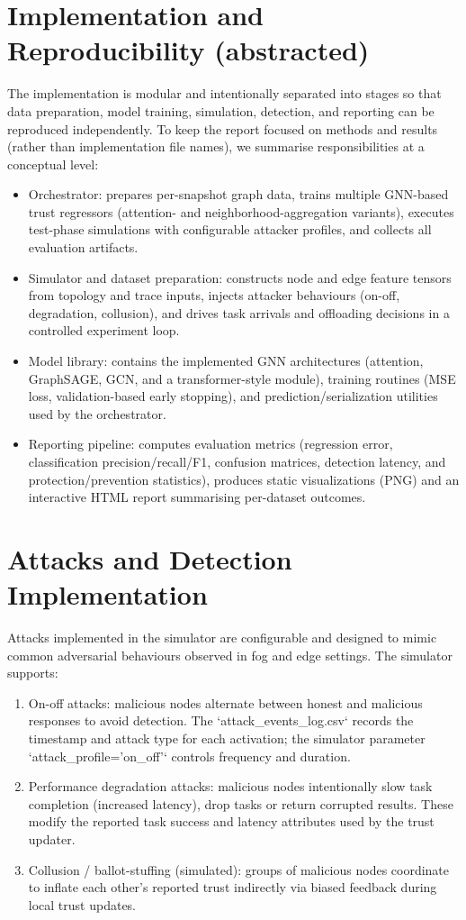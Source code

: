 \documentclass[12pt,a4paper]{article}
\begin{document}
\section{Implementation and Reproducibility (abstracted)}
The implementation is modular and intentionally separated into stages so that data preparation, model training, simulation, detection, and reporting can be reproduced independently. To keep the report focused on methods and results (rather than implementation file names), we summarise responsibilities at a conceptual level:
\begin{itemize}
  \item Orchestrator: prepares per-snapshot graph data, trains multiple GNN-based trust regressors (attention- and neighborhood-aggregation variants), executes test-phase simulations with configurable attacker profiles, and collects all evaluation artifacts.
  \item Simulator and dataset preparation: constructs node and edge feature tensors from topology and trace inputs, injects attacker behaviours (on-off, degradation, collusion), and drives task arrivals and offloading decisions in a controlled experiment loop.
  \item Model library: contains the implemented GNN architectures (attention, GraphSAGE, GCN, and a transformer-style module), training routines (MSE loss, validation-based early stopping), and prediction/serialization utilities used by the orchestrator.
  \item Reporting pipeline: computes evaluation metrics (regression error, classification precision/recall/F1, confusion matrices, detection latency, and protection/prevention statistics), produces static visualizations (PNG) and an interactive HTML report summarising per-dataset outcomes.
\end{itemize}

\section{Attacks and Detection Implementation}
Attacks implemented in the simulator are configurable and designed to mimic common adversarial behaviours observed in fog and edge settings. The simulator supports:
\begin{enumerate}
  \item On-off attacks: malicious nodes alternate between honest and malicious responses to avoid detection. The `attack_events_log.csv` records the timestamp and attack type for each activation; the simulator parameter `attack_profile='on_off'` controls frequency and duration.
  \item Performance degradation attacks: malicious nodes intentionally slow task completion (increased latency), drop tasks or return corrupted results. These modify the reported task success and latency attributes used by the trust updater.
  \item Collusion / ballot-stuffing (simulated): groups of malicious nodes coordinate to inflate each other's reported trust indirectly via biased feedback during local trust updates.
\end{enumerate}
\end{document}
